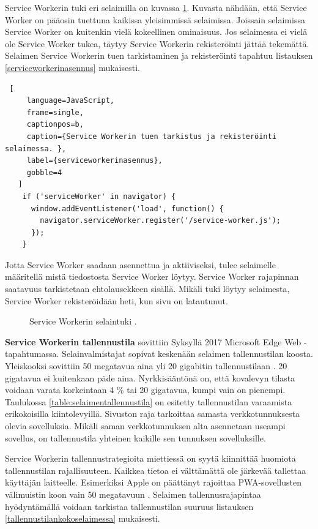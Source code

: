 \documentclass{tktltiki}
\begin{document}
Service Workerin tuki eri selaimilla on kuvassa \ref{Service workerin selaintuki}. Kuvasta nähdään, että Service Worker on pääosin tuettuna kaikissa yleisimmissä selaimissa. Joissain selaimissa Service Worker on kuitenkin vielä kokeellinen ominaisuus. Jos selaimessa ei vielä ole Service Worker tukea, täytyy Service Workerin rekisteröinti jättää tekemättä. Selaimen Service Workerin tuen tarkistaminen ja rekisteröinti tapahtuu listauksen \ref{serviceworkerinasennus} mukaisesti.

\begin{lstlisting} [
     language=JavaScript,
     frame=single,
     captionpos=b,
     caption={Service Workerin tuen tarkistus ja rekisteröinti selaimessa. },
     label={serviceworkerinasennus},
     gobble=4
   ]
    if ('serviceWorker' in navigator) {
      window.addEventListener('load', function() {
        navigator.serviceWorker.register('/service-worker.js');
      });
    }
\end{lstlisting}

Jotta Service Worker saadaan asennettua ja aktiiviseksi, tulee selaimelle määritellä mistä tiedostosta Service Worker löytyy. Service Worker rajapinnan saatavuus tarkistetaan ehtolausekkeen sisällä. Mikäli tuki löytyy selaimesta, Service Worker rekisteröidään heti, kun sivu on latautunut. 

\begin{figure}[h]
\begin{center}
\caption{Service Workerin selaintuki \cite{caniuseServiceWorker}. }
\label{Service workerin selaintuki}
\end{center}
\end{figure}


\textbf{Service Workerin tallennustila} sovittiin Syksyllä 2017 Microsoft Edge Web -tapahtumassa. Selainvalmistajat sopivat keskenään selaimen tallennustilan koosta. Yleiskooksi sovittiin 50 megatavua aina yli 20 gigabitin tallennustilaan \cite{Love}. 20 gigatavua ei kuitenkaan päde aina. Nyrkkisääntönä on, että kovalevyn tilasta voidaan varata korkeintaan 4 \% tai 20 gigatavua, kumpi vain on pienempi. Taulukossa \ref{table:selaimentallennustila} on esitetty tallennustilan varaamista erikokoisilla kiintolevyillä. Sivuston raja tarkoittaa samasta verkkotunnuksesta olevia sovelluksia. Mikäli saman verkkotunnuksen alta asennetaan useampi sovellus, on tallennustila yhteinen kaikille sen tunnuksen sovelluksille. 

Service Workerin tallennustrategioita miettiessä on syytä kiinnittää huomiota tallennustilan rajallisuuteen. Kaikkea tietoa ei välttämättä ole järkevää tallettaa käyttäjän laitteelle. Esimerkiksi Apple on päättänyt rajoittaa PWA-sovellusten välimuistin koon vain 50 megatavuun \cite{Love}. Selaimen tallennusrajapintaa hyödyntämällä voidaan tarkistaa tallennustilan suuruus listauksen \ref{tallennustilankokoselaimessa} mukaisesti.
\end{document}
